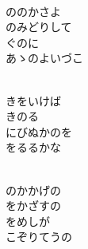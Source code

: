 \documentclass[10pt,b5j]{tarticle} %
\begin{document}
\begin{enumerate}
\begin{minipage}[c]{\blocksize}
    \end{minipage}
    \begin{minipage}[c]{\blocksize}
        
        \vspace{\linespace}
        \item~\\
        ののかさよ\\
        のみどりして\\
        ぐのに\\
        あゝのよいづこ
        
    \end{minipage}
    \begin{minipage}[c]{\blocksize}
        
        \vspace{\linespace}
        \item~\\
        きをいけば\\
        きのる\\
        にびぬかのを\\
        をるるかな
        
    \end{minipage}
    \begin{minipage}[c]{\blocksize}
        
        \vspace{\linespace}
        \item~\\
        のかかげの\\
        をかざすの\\
        をめしが\\
        こぞりてうの
    
    \end{minipage}
\end{enumerate} %
\end{document}
